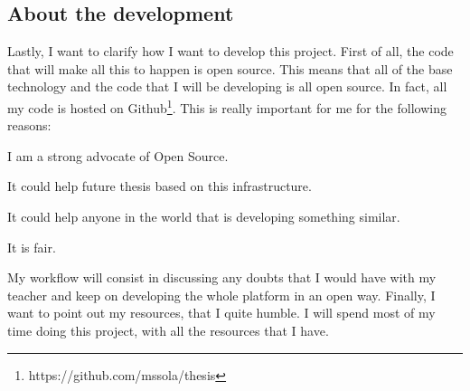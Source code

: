 \subsection{About the development}

Lastly, I want to clarify how I want to develop this project. First of all, the
code that will make all this to happen is open source. This means that all of
the base technology and the code that I will be developing is all open source.
In fact, all my code is hosted on
Github\footnote{https://github.com/mssola/thesis}. This is really important for
me for the following reasons:

\espai

\mylist
  \item I am a strong advocate of Open Source.
  \item It could help future thesis based on this infrastructure.
  \item It could help anyone in the world that is developing something similar.
  \item It is fair.
\mylistend

My workflow will consist in discussing any doubts that I would have with my
teacher and keep on developing the whole platform in an open way. Finally, I
want to point out my resources, that I quite humble. I will spend most of my
time doing this project, with all the resources that I have.
